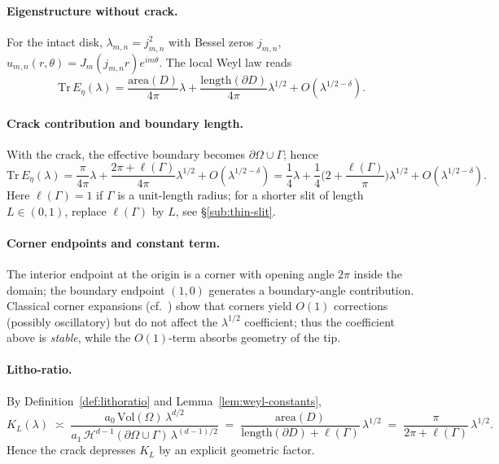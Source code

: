 \paragraph{Eigenstructure without crack.}
For the intact disk, $\lambda_{m,n}=j_{m,n}^2$ with Bessel zeros $j_{m,n}$,
$u_{m,n}(r,\theta)=J_m(j_{m,n} r)e^{i m\theta}$. The local Weyl law reads
\[
\mathrm{Tr}\,E_\eta(\lambda)
= \frac{\mathrm{area}(D)}{4\pi}\lambda + \frac{\mathrm{length}(\partial D)}{4\pi}\lambda^{1/2}+O(\lambda^{1/2-\delta}).
\]

\paragraph{Crack contribution and boundary length.}
With the crack, the effective boundary becomes $\partial\Omega\cup\Gamma$; hence
\[
\mathrm{Tr}\,E_\eta(\lambda)=\frac{\pi}{4\pi}\lambda + \frac{2\pi+\ell(\Gamma)}{4\pi}\lambda^{1/2} + O(\lambda^{1/2-\delta})
=\frac{1}{4}\lambda + \frac{1}{4}\Big(2 + \frac{\ell(\Gamma)}{\pi}\Big)\lambda^{1/2}+ O(\lambda^{1/2-\delta}).
\]
Here $\ell(\Gamma)=1$ if $\Gamma$ is a unit-length radius; for a shorter slit of length $L\in(0,1)$,
replace $\ell(\Gamma)$ by $L$, see \S\ref{sub:thin-slit}.

\paragraph{Corner endpoints and constant term.}
The interior endpoint at the origin is a corner with opening angle $2\pi$ inside the domain;
the boundary endpoint $(1,0)$ generates a boundary-angle contribution.
Classical corner expansions (cf.\ \cite{KozlovNazarovPlamenevskii2001,SafarovVassiliev1997})
show that corners yield $O(1)$ corrections (possibly oscillatory) but do not affect the
$\lambda^{1/2}$ coefficient; thus the coefficient above is \emph{stable}, while the $O(1)$-term
absorbs geometry of the tip.

\paragraph{Litho-ratio.}
By Definition~\ref{def:lithoratio} and Lemma~\ref{lem:weyl-constants},
\[
K_L(\lambda)\;\asymp\;\frac{a_0\,\mathrm{Vol}(\Omega)\,\lambda^{d/2}}
{a_1\,\mathcal{H}^{d-1}(\partial\Omega\cup\Gamma)\,\lambda^{(d-1)/2}}
\;=\;\frac{\mathrm{area}(D)}{\mathrm{length}(\partial D)+\ell(\Gamma)}\,\lambda^{1/2}
\;=\;\frac{\pi}{2\pi+\ell(\Gamma)}\,\lambda^{1/2}.
\]
Hence the crack depresses $K_L$ by an explicit geometric factor.

